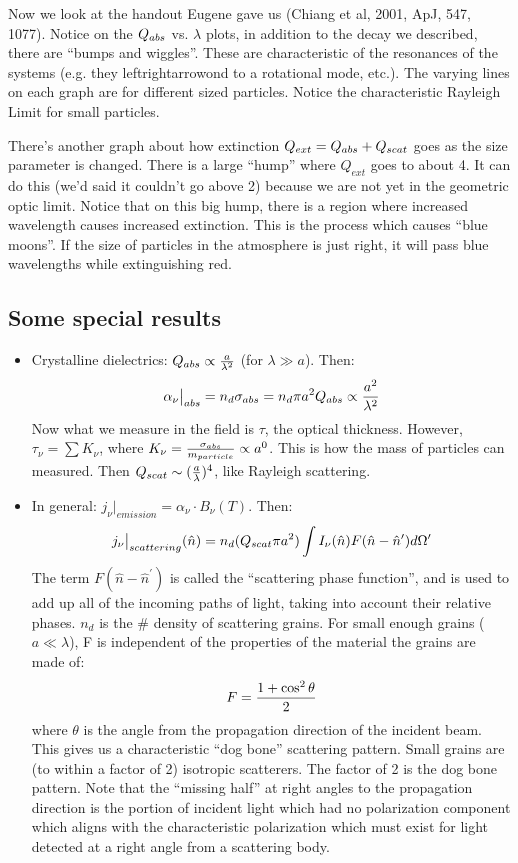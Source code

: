 \documentclass[11pt]{article}
\def\^{\hat}
\def\eval#1{\big|_{#1}}
\begin{document}
Now we look at the handout Eugene gave us (Chiang et al, 2001, ApJ, 547, 1077).
Notice on the $Q_{abs}$ vs. $\lambda$ plots, in addition to the decay we
described, there are ``bumps and wiggles''.  These are characteristic of the
resonances of the systems (e.g. they leftrightarrowond to a rotational mode, etc.).
The varying lines on each graph are for different sized particles.  Notice the
characteristic Rayleigh Limit for small particles. \par

\def\qext{Q_{ext}}
There's another graph about how extinction $\qext = \qabs + \qscat$ goes as
the size parameter is changed.  There is a large ``hump'' where $\qext$ goes to
about 4.  It can do this (we'd said it couldn't go above 2) because we are not
yet in the geometric optic limit.  Notice that on this big hump, there is a
region where increased wavelength causes increased extinction.  This is the
process which causes ``blue moons''.  If the size of particles in the atmosphere
is just right, it will pass blue wavelengths while extinguishing red.\par

\subsection*{ Some special results}

\def\sabs{\sigma_{abs}}
\begin{itemize}
\item  Crystalline dielectrics: $Q_{abs} \propto {a\over \lambda^2}$ (for
$\lambda \gg a$).  Then:
$$\alpha_\nu \eval{abs} = n_d\sabs = n_d\pi a^2\qabs
\propto {a^2\over \lambda^2}$$
Now what we measure in the field is $\tau$, the
optical thickness.  However, $\tau_\nu = \sum{K_\nu}$, where $K_\nu = 
{\sabs \over m_{particle}} \propto a^0$.  This is how the mass of 
particles can measured. Then $Q_{scat} \sim ({a\over \lambda})^4$, like
Rayleigh scattering.
\item  In general: $j_\nu\eval{emission} = \alpha_\nu \cdot B_\nu(T)$.
Then:
$$j_\nu\eval{scattering}(\^n) = n_d(\qscat\pi a^2)\int{I_\nu(\^n)
F(\^n-\^n^\prime)d\Omega^\prime}$$
The term $F(\^n - \^n^\prime)$ is called the ``scattering phase function'', and
is used to add up all of the incoming paths of light, taking into account their
relative phases.  $n_d$ is the \# density of scattering grains.  For small
enough grains ($a\ll \lambda$), F is independent of the properties of the
material the grains are made of:
$$F = {1+\cos^2\theta\over 2}$$
where $\theta$ is the angle from the propagation direction of the incident beam.
This gives us a characteristic ``dog bone'' scattering pattern. Small grains
are (to within a factor of 2) isotropic scatterers.  The factor of 2 is the 
dog bone pattern.  Note that the ``missing half'' at right angles to the
propagation direction is the portion of incident light which had no polarization
component which aligns with the characteristic polarization which must exist
for light detected at a right angle from a scattering body.
\end{itemize}
\end{document}
